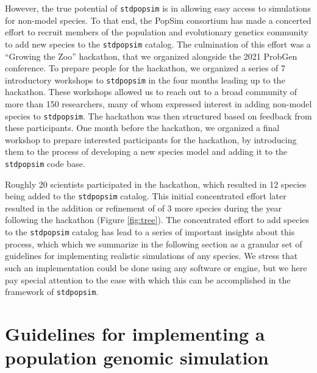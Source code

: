 \documentclass[hidelinks]{article}
\newcommand{\stdpopsim}{\texttt{stdpopsim}\xspace}
\begin{document}
However, the true potential of \stdpopsim is in allowing easy access to simulations
for non-model species. To that end, the PopSim consortium has made a concerted
effort to recruit members of the population and evolutionary genetics community
to add new species to the \stdpopsim catalog. The culmination of this effort was a
``Growing the Zoo'' hackathon, that we organized alongside the 2021 ProbGen conference.
To prepare people for the hackathon, we organized a series of 7
introductory workshops to \stdpopsim in the four months leading up to the hackathon.
These workshops allowed us to reach out to a broad community of more than 150 researchers,
many of whom expressed interest in adding non-model species to \stdpopsim.
The hackathon was then structured based on feedback from these participants.
One month before the hackathon, we organized a final workshop to prepare interested
participants for the hackathon, by introducing them to  the process of developing
a new species model and adding it to the \stdpopsim code base.

Roughly 20 scientists participated in the hackathon,
which resulted in 12 species being added to the \stdpopsim catalog.
This initial concentrated effort later resulted in the addition or refinement of
of 3 more species during the year following the hackathon (Figure \ref{fig:tree}).
The concentrated effort to add species to the \stdpopsim catalog
has lead to a series of important insights about this process,
which which we summarize in the following section as a granular set of guidelines
for implementing realistic simulations of any species. We stress that such
an implementation could be done using any software or engine, but we
here pay special attention to the ease with which this can be accomplished
in the framework of \stdpopsim.





\hypertarget{sec3}{
\section*{Guidelines for implementing a population genomic simulation}\label{sec:sim-guidelines}}
\end{document}
